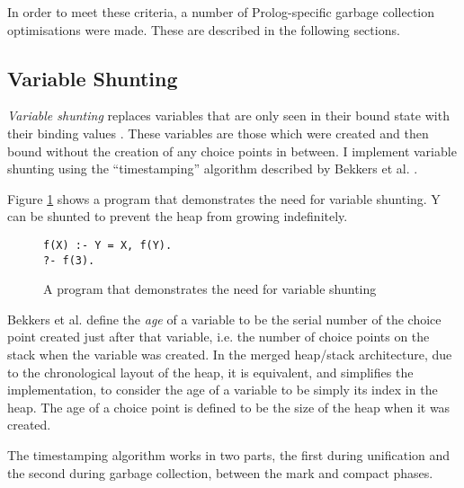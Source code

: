 In order to meet these criteria, a number of Prolog-specific garbage collection optimisations were made. These are described in the following sections.

\subsection{Variable Shunting}

\label{sec:variable-shunting}

\emph{Variable shunting} replaces variables that are only seen in their bound state with their binding values \cite{sahlinVariableShuntingWAM1991}. These variables are those which were created and then bound without the creation of any choice points in between. I implement variable shunting using the ``timestamping'' algorithm described by Bekkers et al. \cite{bekkersDynamicMemoryManagement1992}.

Figure \ref{fig:shunt-program} shows a program that demonstrates the need for variable shunting. Y can be shunted to prevent the heap from growing indefinitely.

\begin{figure}[H]
\centering
\begin{verbatim}
f(X) :- Y = X, f(Y).
?- f(3).
\end{verbatim}
\caption{A program that demonstrates the need for variable shunting}
\label{fig:shunt-program}
\end{figure}

Bekkers et al. define the \emph{age} of a variable to be the serial number of the choice point created just after that variable, i.e. the number of choice points on the stack when the variable was created. In the merged heap/stack architecture, due to the chronological layout of the heap, it is equivalent, and simplifies the implementation, to consider the age of a variable to be simply its index in the heap. The age of a choice point is defined to be the size of the heap when it was created.

The timestamping algorithm works in two parts, the first during unification and the second during garbage collection, between the mark and compact phases.

